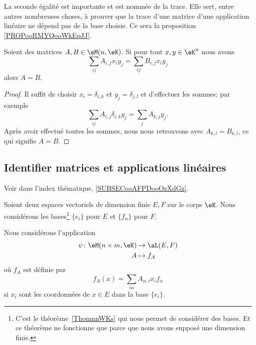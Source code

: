 \begin{normaltext}
	La seconde égalité est importante et est nommée  de la trace. Elle sert, entre autres nombreuses choses, à prouver que la trace d'une matrice d'une application linéaire ne dépend pas de la base choisie. Ce sera la proposition \ref{PROPooRMYQooWkEpJJ}.
\end{normaltext}

\begin{lemma}       \label{LEMooLXAHooPRyHaF}
	Soient des matrices \( A,B\in \eM(n,\eK)\). Si pour tout \( x,y\in \eK^n\) nous avons
	\begin{equation}
		\sum_{ij}A_{i,j}x_iy_j=\sum_{ij}B_{i,j}x_iy_j
	\end{equation}
	alors \( A=B\).
\end{lemma}

\begin{proof}
	Il suffit de choisir \( x_i=\delta_{i,k}\) et \( y_j=\delta_{j,l}\) et d'effectuer les sommes; par exemple
	\begin{equation}
		\sum_{ij}A_{i,j}\delta_{i,k}y_j=\sum_jA_{k,j}y_j.
	\end{equation}
	Après avoir effectué toutes les sommes, nous nous retrouvons avec \( A_{k,l}=B_{k,l}\), ce qui signifie \( A=B\).
\end{proof}


\subsection{Identifier matrices et applications linéaires}

Voir dans l'index thématique, \ref{SUBSECooAFPDooOzXdGz}.

Soient deux espaces vectoriels de dimension finie \( E,F\) sur le corps \( \eK\). Nous considérons les bases\footnote{C'est le théorème~\ref{ThonmnWKs} qui nous permet de considérer des bases. Et ce théorème ne fonctionne que parce que nous avons supposé une dimension finie.} \( \{ e_i \}\) pour \( E\) et \( \{ f_{\alpha} \}\) pour \( F\).

\begin{definition}      \label{DEFooJVOAooUgGKme}
	Nous considérons l'application
	\begin{equation}        \label{EQooVZQWooMyFFeO}
		\begin{aligned}
			\psi\colon \eM(n\times m, \eK) & \to \aL(E,F) \\
			A                              & \mapsto f_A
		\end{aligned}
	\end{equation}
	où \( f_A\) est définie par
	\begin{equation}        \label{EQooBVGHooJhFbMs}
		f_A(x)=\sum_{i\alpha}A_{\alpha, i}x_if_{\alpha}
	\end{equation}
	si \( x_i\) sont les coordonnées de \( x\in E\) dans la base \( \{ e_i \}\).
\end{definition}

